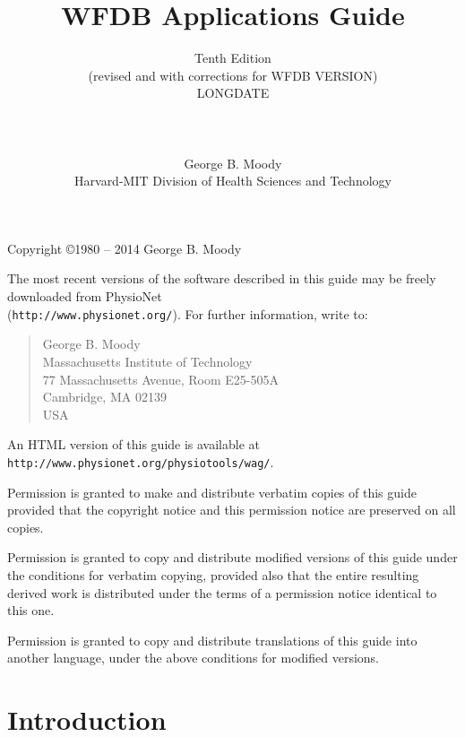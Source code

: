 \documentclass[twoside]{book}
\title{WFDB Applications Guide}
\author{Tenth Edition\\
(revised and with corrections for WFDB VERSION)\\
LONGDATE\\
\\
\\
\\
George B. Moody\\
Harvard-MIT Division of Health Sciences and Technology}
\date{}
\begin{document}
\maketitle

\pagestyle{empty}
\vspace*{\fill}
\noindent
Copyright \copyright 1980 -- 2014 George B. Moody

\vspace{1 in}
\noindent
The most recent versions of the software described in this guide may be
freely downloaded from PhysioNet\\
({\tt http://www.physionet.org/}).
For further information, write to:

\begin{quote}
George B. Moody\\
Massachusetts Institute of Technology\\
77 Massachusetts Avenue, Room E25-505A\\
Cambridge, MA 02139\\
USA\\
\end{quote}

\noindent
An HTML version of this guide is available at
{\tt http://www.\-physio\-net.\-org/\-physio\-tools/\-wag/}.

\vspace{0.2 in}
\noindent
Permission is granted to make and distribute verbatim copies of this
guide provided that the copyright notice and this permission notice are
preserved on all copies.

\vspace{0.2 in}
\noindent
Permission is granted to copy and distribute modified versions of this
guide under the conditions for verbatim copying, provided also that the
entire resulting derived work is distributed under the terms of a
permission notice identical to this one.

\vspace{0.2 in}
\noindent
Permission is granted to copy and distribute translations of this guide
into another language, under the above conditions for modified versions.

\newpage
\pagestyle{fancyplain}

\tableofcontents

\newpage
{}


\chapter*{Introduction}
\end{document}
